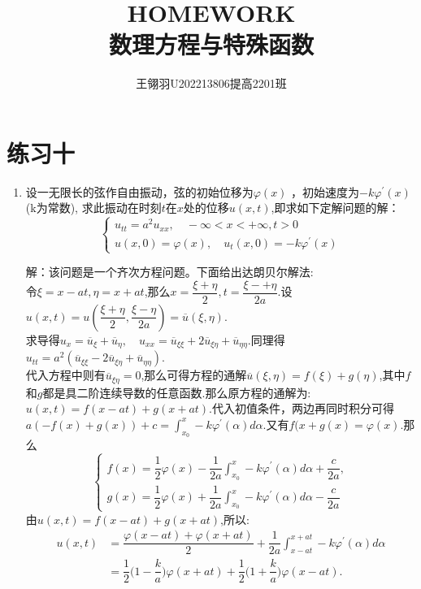 \documentclass[11pt]{article}
\begin{document}
\title{\vspace{-2cm}HOMEWORK\\ 数理方程与特殊函数}
\author{王翎羽\quad U202213806\quad 提高2201班}
\maketitle

\section*{练习十}
\begin{enumerate}
    \item 设一无限长的弦作自由振动，弦的初始位移为$\varphi(x)$ ，初始速度为$-k\varphi^{'}(x)$ (k为常数), 求此振动在时刻$t$在$x$处的位移$u(x,t)$,即求如下定解问题的解：
     \begin{equation*}
        \left\{
         \begin{array}{lr}
         u_{tt}=a^2u_{xx},\quad -\infty <x < +\infty, t>0\\u(x,0)=\varphi(x),\quad u_t(x,0)=-k\varphi^{'}(x)
         \end{array}
        \right.
     \end{equation*}

    解：该问题是一个齐次方程问题。下面给出达朗贝尔解法:\\[8pt]
    令$\xi=x-at,\eta=x+at$,那么$x=\dfrac{\xi+\eta}{2},t=\dfrac{\xi-+\eta}{2a}$.设$u(x,t)=u(\dfrac{\xi+\eta}{2},\dfrac{\xi-\eta}{2a})=\overline{u}(\xi,\eta)$.\\[8pt]
    求导得$u_x=\overline{u}_{\xi}+\overline{u}_{\eta},\quad u_{xx}=\overline{u}_{\xi\xi}+2\overline{u}_{\xi\eta}+\overline{u}_{\eta\eta}$.同理得$u_{tt}=a^2(\overline{u}_{\xi\xi}-2\overline{u}_{\xi\eta}+\overline{u}_{\eta\eta})$.\\
    代入方程中则有$\overline{u}_{\xi\eta}=0$,那么可得方程的通解$\overline{u}(\xi,\eta)=f(\xi)+g(\eta)$,其中$f$和$g$都是具二阶连续导数的任意函数.那么原方程的通解为:
    $u(x,t)=f(x-at)+g(x+at)$.代入初值条件，两边再同时积分可得$a(-f(x)+g(x))+c=\displaystyle\int_{x_0}^{x}-k\varphi^{'}(\alpha)d\alpha$.又有$f(x+g(x)=\varphi(x)$.那么
    \[
        \begin{cases}
            f(x)=\dfrac{1}{2}\varphi(x)-\dfrac{1}{2a}\displaystyle\int_{x_0}^{x}-k\varphi^{'}(\alpha)d\alpha+\dfrac{c}{2a},\\[8pt]
            g(x)=\dfrac{1}{2}\varphi(x)+\dfrac{1}{2a}\displaystyle\int_{x_0}^{x}-k\varphi^{'}(\alpha)d\alpha-\dfrac{c}{2a}
        \end{cases}
    \]
    由$u(x,t)=f(x-at)+g(x+at)$,所以:
    \begin{align*}
    u(x,t)&=\dfrac{\varphi(x-at)+\varphi(x+at)}{2}+\dfrac{1}{2a}\displaystyle\int_{x-at}^{x+at}-k\varphi^{'}(\alpha)d\alpha      \\[8pt]
        &=\dfrac{1}{2}\big(1-\dfrac{k}{a}\big)\varphi(x+at)+\dfrac{1}{2}\big(1+\dfrac{k}{a}\big)\varphi(x-at). \nonumber    \\
    \end{align*}


\end{enumerate}
\end{document}
